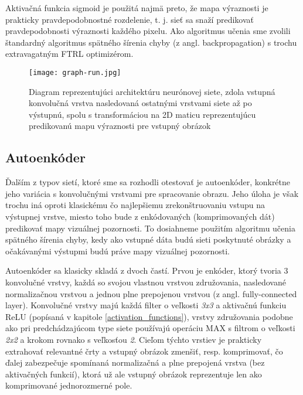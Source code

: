 Aktivačná funkcia sigmoid je použitá najmä preto, že mapa výraznosti je prakticky pravdepodobnostné rozdelenie, t. j. sieť sa snaží predikovať pravdepodobnosti výraznosti každého pixelu. Ako algoritmus učenia sme zvolili štandardný algoritmus spätného šírenia chyby (z angl. backpropagation) s trochu extravagatným FTRL optimizérom.

\begin{figure}[H]
	\begin{center}\texttt{[image: graph-run.jpg]}
		\caption[Návrh architektúry neurónovej siete]{
			Diagram reprezentujúci architektúru neurónovej siete, zdola vstupná konvolučná vrstva nasledovaná ostatnými vrstvami siete až po výstupnú, spolu s transformáciou na 2D maticu reprezentujúcu predikovanú mapu výraznosti pre vstupný obrázok
		}\label{my_tensorboard_cnn}
	\end{center}
\end{figure}

\subsection{Autoenkóder}
\label{autoencoder_design}
Ďalším z typov sietí, ktoré sme sa rozhodli otestovať je autoenkóder, konkrétne jeho variácia s konvolučnými vrstvami pre spracovanie obrazu. Jeho úloha je však trochu iná oproti klasickému čo najlepšiemu zrekonštruovaniu vstupu na výstupnej vrstve, miesto toho bude z enkódovaných (komprimovaných dát) predikovať mapy vizuálnej pozornosti. To dosiahneme použitím algoritmu učenia spätného šírenia chyby, kedy ako vstupné dáta budú sieti poskytnuté obrázky a očakávanými výstupmi budú práve mapy vizuálnej pozornosti.

Autoenkóder sa klasicky skladá z dvoch častí. Prvou je enkóder, ktorý tvoria 3 konvolučné vrstvy, každá so svojou vlastnou vrstvou združovania, nasledované normalizačnou vrstvou a jednou plne prepojenou vrstvou (z angl. fully-connected layer). Konvolučné vrstvy majú každá filter o veľkosti \textit{3x3} a aktivačnú funkciu ReLU (popísaná v kapitole \ref{activation_functions}), vrstvy združovania podobne ako pri predchádzajúcom type siete používajú operáciu MAX s filtrom o veľkosti \textit{2x2} a krokom rovnako s veľkosťou \textit{2}. Cieľom týchto vrstiev je prakticky extrahovať relevantné črty a vstupný obrázok zmenšiť, resp. komprimovať, čo ďalej zabezpečuje spomínaná normalizačná a plne prepojená vrstva (bez aktivačných funkcií), ktorá už ale vstupný obrázok reprezentuje len ako komprimované jednorozmerné pole. 

